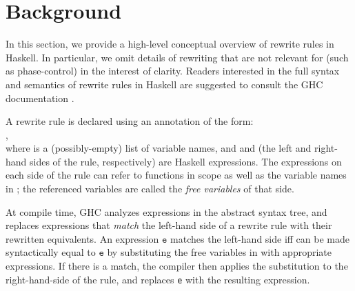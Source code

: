 \section{Background}
\label{sec:background}

In this section, we provide a high-level conceptual overview of rewrite rules in
Haskell. In particular, we omit details of rewriting that are not relevant for
\Rulecheck (such as phase-control) in the interest of clarity. Readers
interested in the full syntax and semantics of rewrite rules in Haskell are
suggested to consult the GHC documentation \cite{userguide}.

A rewrite rule is declared using an annotation of the form:\\ \rrule,\\ where \rbinders is a (possibly-empty) list
of variable names, and \rlhs and \rrhs (the left and
right-hand sides of the rule, respectively) are Haskell expressions. The
expressions on each side of the rule can refer to functions in scope as well as
the variable names in \rbinders; the referenced variables are called
the \textit{free variables} of that side.

At compile time, GHC analyzes expressions in the abstract syntax tree, and
replaces expressions that \textit{match} the left-hand side of a rewrite rule
with their rewritten equivalents. An expression $\texttt{e}$ matches the
left-hand side \rlhs iff \rlhs can be made syntactically equal to $\texttt{e}$
by substituting the free variables in \rlhs with appropriate expressions. If
there is a match, the compiler then applies the substitution to the
right-hand-side of the rule, and replaces \texttt{e} with the resulting
expression.


